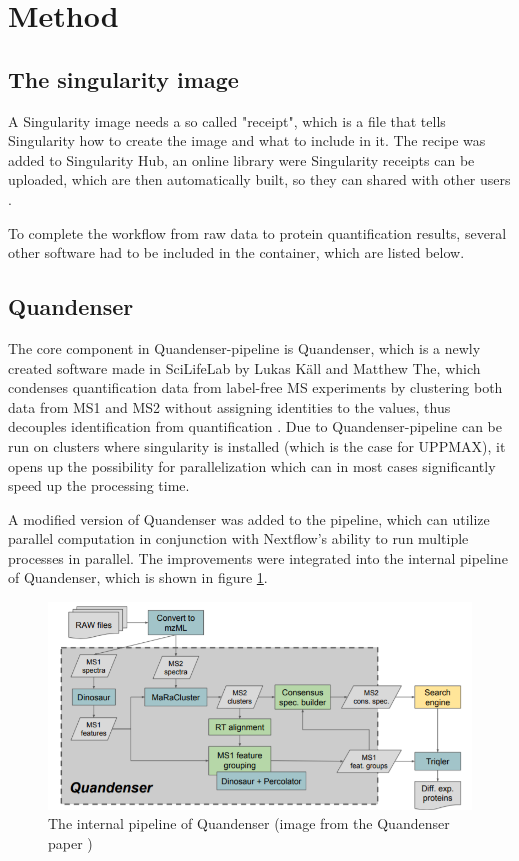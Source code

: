 \section{Method}

\subsection{The singularity image}
A Singularity image needs a so called "receipt", which is a file that tells Singularity how to create the image and what to include in it. The recipe was added to Singularity Hub, an online library were Singularity receipts can be uploaded, which are then automatically built, so they can shared with other users \cite{singularity-hub}.

To complete the workflow from raw data to protein quantification results, several other software had to be included in the container, which are listed below.

\subsection{Quandenser} \label{ssec:quandenser-method}
 The core component in Quandenser-pipeline is Quandenser, which is a newly created software made in SciLifeLab by Lukas Käll and Matthew The, which condenses quantification data from label-free MS experiments by clustering both data from MS1 and MS2 without assigning identities to the values, thus decouples identification from quantification \cite{quandenser}. Due to Quandenser-pipeline can be run on clusters where singularity is installed (which is the case for UPPMAX), it opens up the possibility for parallelization which can in most cases significantly speed up the processing time.

A modified version of Quandenser was added to the pipeline, which can utilize parallel computation in conjunction with Nextflow's ability to run multiple processes in parallel. The improvements were integrated into the internal pipeline of Quandenser, which is shown in figure \ref{fig:quandenser-internal-pipeline}.

\begin{figure}[H]
  \centering
  \includegraphics[width=\linewidth]{pictures/quandenser-internal.png}
  \caption{The internal pipeline of Quandenser (image from the Quandenser paper \cite{quandenser})}
  \label{fig:quandenser-internal-pipeline}
\end{figure}

